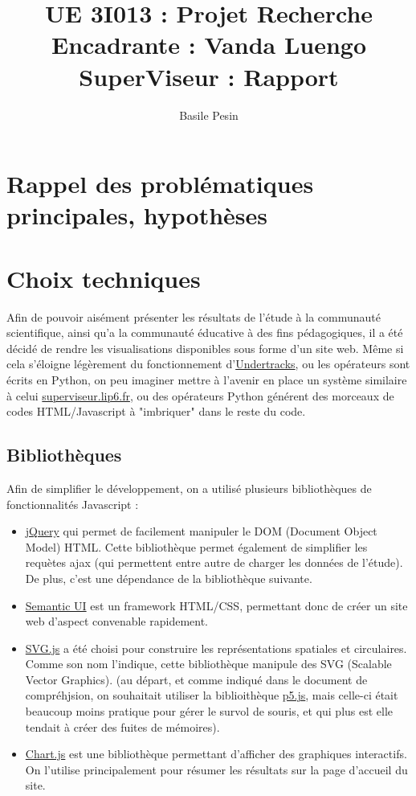 \documentclass{article}
\title{UE 3I013 : Projet Recherche\\
    Encadrante : Vanda Luengo\\
    SuperViseur : Rapport}
\author{Basile Pesin}
\begin{document}
\maketitle
\newpage

\section{Rappel des problématiques principales, hypothèses}


\section{Choix techniques}
Afin de pouvoir aisément présenter les résultats de l'étude à la communauté scientifique, ainsi qu'a la communauté éducative à des fins pédagogiques, il a été décidé de rendre les visualisations disponibles sous forme d'un site web. Même si cela s'éloigne légèrement du fonctionnement d'\href{https://undertracks.imag.fr}{Undertracks}, ou les opérateurs sont écrits en Python, on peu imaginer mettre à l'avenir en place un système similaire à celui \href{http://superviseur.lip6.fr}{superviseur.lip6.fr}, ou des opérateurs Python générent des morceaux de codes HTML/Javascript à "imbriquer" dans le reste du code.

\subsection{Bibliothèques}
Afin de simplifier le développement, on a utilisé plusieurs bibliothèques de fonctionnalités Javascript :
\begin{itemize}
    \item \href{https://jquery.com/}{jQuery} qui permet de facilement manipuler le DOM (Document Object Model) HTML. Cette bibliothèque permet également de simplifier les requètes ajax (qui permettent entre autre de charger les données de l'étude). De plus, c'est une dépendance de la bibliothèque suivante.
    \item \href{https://semantic-ui.com/}{Semantic UI} est un framework HTML/CSS, permettant donc de créer un site web d'aspect convenable rapidement.
    \item \href{http://svgjs.com/}{SVG.js} a été choisi pour construire les représentations spatiales et circulaires. Comme son nom l'indique, cette bibliothèque manipule des SVG (Scalable Vector Graphics). (au départ, et comme indiqué dans le document de compréhjsion, on souhaitait utiliser la biblioithèque \href{https://p5js.org/}{p5.js}, mais celle-ci était beaucoup moins pratique pour gérer le survol de souris, et qui plus est elle tendait à créer des fuites de mémoires).
    \item \href{http://www.chartjs.org/}{Chart.js} est une bibliothèque permettant d'afficher des graphiques interactifs. On l'utilise principalement pour résumer les résultats sur la page d'accueil du site.
\end{itemize}
\end{document}
